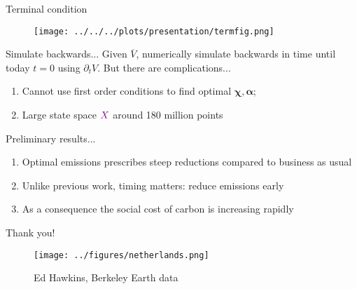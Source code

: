 \documentclass[pdf]{beamer}
\newcommand{\control}[1]{\bm{#1}}
\newcommand{\X}{{\color{violet} X}}
\begin{document}
\begin{frame}{Terminal condition}
    \begin{figure}[H]
        \centering
        \texttt{[image: ../../../plots/presentation/termfig.png]}
    \end{figure}
\end{frame}

\begin{frame}{Simulate backwards...}
    Given $\overline{V}$, numerically simulate backwards in time until today $t = 0$ using $\partial_t V$. But there are complications... \hspace{2em}
    \begin{enumerate}
        \item Cannot use first order conditions to find optimal $\control{\chi}, \control{\alpha}$;
        \item Large state space $\X$ around 180 million points
    \end{enumerate}
\end{frame}

\begin{frame}{Preliminary results...}
    \begin{enumerate}
        \item Optimal emissions prescribes steep reductions compared to business as usual
        \item Unlike previous work, timing matters: reduce emissions early
        \item As a consequence the social cost of carbon is increasing rapidly 
    \end{enumerate}
\end{frame}


\begin{frame}{Thank you!}
    \centering
    \begin{figure}
        \texttt{[image: ../figures/netherlands.png]}
        \caption{Ed Hawkins, Berkeley Earth data}
    \end{figure}
\end{frame}
\end{document}
